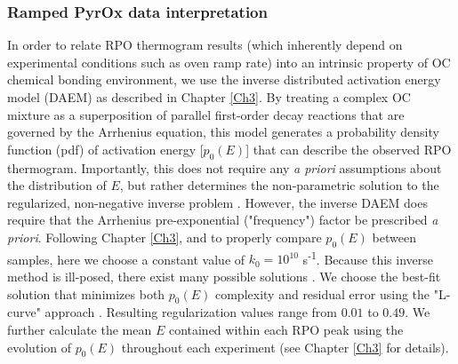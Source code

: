 \subsubsection{Ramped PyrOx data interpretation}\label{Ch6SD2}

In order to relate RPO thermogram results (which inherently depend on experimental conditions such as oven ramp rate) into an intrinsic property of OC chemical bonding environment, we use the inverse distributed activation energy model (DAEM) as described in Chapter \ref{Ch3}. By treating a complex OC mixture as a superposition of parallel first-order decay reactions that are governed by the Arrhenius equation, this model generates a probability density function (pdf) of activation energy [$p_{0}(E)$] that can describe the observed RPO thermogram. Importantly, this does not require any \textit{a priori} assumptions about the distribution of $E$, but rather determines the non-parametric solution to the regularized, non-negative inverse problem \citep[][Chapter \ref{Ch3}]{Forney:2012dr,Forney:2012hz}. However, the inverse DAEM does require that the Arrhenius pre-exponential ("frequency") factor be prescribed \textit{a priori}. Following Chapter \ref{Ch3}, and to properly compare $p_{0}(E)$ between samples, here we choose a constant value of $k_{0} = 10^{10}$ s\textsuperscript{-1}. Because this inverse method is ill-posed, there exist many possible solutions \citep{Hansen:1994uc}. We choose the best-fit solution that minimizes both $p_{0}(E)$ complexity \citep[as measured by the roughness norm;][]{Forney:2012dr} and residual error using the "L-curve" approach \citep{Tikhonov:1977ui,Hansen:1994uc}. Resulting regularization  values range from $0.01$ to $0.49$. We further calculate the mean $E$ contained within each RPO peak using the evolution of $p_{0}(E)$ throughout each experiment (see Chapter \ref{Ch3} for details).

